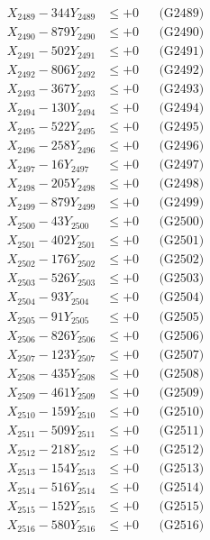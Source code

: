 \documentclass[a4paper,10pt]{article}
\begin{document}
{\begin{align}
X_{2489} - 344Y_{2489} &\leq +0 && \text{(G2489)} \\
X_{2490} - 879Y_{2490} &\leq +0 && \text{(G2490)} \\
\allowbreak
X_{2491} - 502Y_{2491} &\leq +0 && \text{(G2491)} \\
X_{2492} - 806Y_{2492} &\leq +0 && \text{(G2492)} \\
X_{2493} - 367Y_{2493} &\leq +0 && \text{(G2493)} \\
X_{2494} - 130Y_{2494} &\leq +0 && \text{(G2494)} \\
X_{2495} - 522Y_{2495} &\leq +0 && \text{(G2495)} \\
X_{2496} - 258Y_{2496} &\leq +0 && \text{(G2496)} \\
X_{2497} - 16Y_{2497} &\leq +0 && \text{(G2497)} \\
X_{2498} - 205Y_{2498} &\leq +0 && \text{(G2498)} \\
X_{2499} - 879Y_{2499} &\leq +0 && \text{(G2499)} \\
X_{2500} - 43Y_{2500} &\leq +0 && \text{(G2500)} \\
\allowbreak
X_{2501} - 402Y_{2501} &\leq +0 && \text{(G2501)} \\
X_{2502} - 176Y_{2502} &\leq +0 && \text{(G2502)} \\
X_{2503} - 526Y_{2503} &\leq +0 && \text{(G2503)} \\
X_{2504} - 93Y_{2504} &\leq +0 && \text{(G2504)} \\
X_{2505} - 91Y_{2505} &\leq +0 && \text{(G2505)} \\
X_{2506} - 826Y_{2506} &\leq +0 && \text{(G2506)} \\
X_{2507} - 123Y_{2507} &\leq +0 && \text{(G2507)} \\
X_{2508} - 435Y_{2508} &\leq +0 && \text{(G2508)} \\
X_{2509} - 461Y_{2509} &\leq +0 && \text{(G2509)} \\
X_{2510} - 159Y_{2510} &\leq +0 && \text{(G2510)} \\
\allowbreak
X_{2511} - 509Y_{2511} &\leq +0 && \text{(G2511)} \\
X_{2512} - 218Y_{2512} &\leq +0 && \text{(G2512)} \\
X_{2513} - 154Y_{2513} &\leq +0 && \text{(G2513)} \\
X_{2514} - 516Y_{2514} &\leq +0 && \text{(G2514)} \\
X_{2515} - 152Y_{2515} &\leq +0 && \text{(G2515)} \\
X_{2516} - 580Y_{2516} &\leq +0 && \text{(G2516)} \\

\end{align}}
\end{document}
